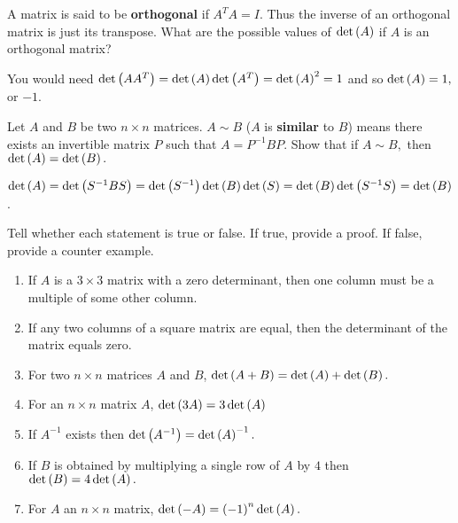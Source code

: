 \begin{enumialphparenastyle}
\begin{ex} \label{exer-orthogonal}A matrix is said to be \textbf{orthogonal}  if 
$A^{T}A=I.$ Thus the inverse of an orthogonal matrix is just its transpose.
What are the possible values of $\det \left(A\right) $ if $A$ is an
orthogonal matrix? 
\begin{sol}
You would need $\det \left(AA^{T}\right) =\det
\left(A\right) \det \left(A^{T}\right) =\det \left(A\right) ^{2}=1$ and
so $\det \left(A\right) =1,$ or $-1$.
\end{sol}
\end{ex}

\begin{ex} Let $A$ and $B$ be two $n\times n$ matrices. $A\sim B$
($A$ is \textbf{similar} to $B$) means there exists an invertible matrix $P$
such that $A=P^{-1}BP.$ Show that if $A\sim B,$ then 
$\det \left(A\right) =\det \left(B\right) .$ 
\begin{sol}
$\det \left(A\right) =\det
\left(S^{-1}BS\right) =\det \left(S^{-1}\right) \det \left(B\right) \det
\left(S\right) =\det \left(B\right) \det \left(S^{-1}S\right) =\det
\left(B\right) $.
\end{sol}
\end{ex}

\begin{ex} Tell whether each statement is true or false. If true, provide a proof. If false, provide a counter example. 
\begin{enumerate}
\item If $A$ is a $3\times 3$ matrix with a zero determinant, then one
column must be a multiple of some other column.

\item If any two columns of a square matrix are equal, then the determinant
of the matrix equals zero.

\item For two $n\times n$ matrices $A$ and $B$, $\det \left(A+B\right)
=\det \left(A\right) +\det \left(B\right) .$

\item For an $n\times n$ matrix $A$, $\det \left(3A\right) =3\det \left(
A\right) $

\item If $A^{-1}$ exists then $\det \left(A^{-1}\right) =\det \left(
A\right) ^{-1}.$

\item If $B$ is obtained by multiplying a single row of $A$ by $4$ then $%
\det \tup{B} =4\det \tup{A} .$

\item For $A$ an $n\times n$ matrix, $\det \left(-A\right) =\left(
-1\right) ^{n}\det \left(A\right) .$


\end{enumerate}
\end{ex}
\end{enumialphparenastyle}
